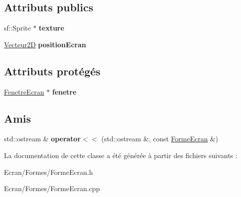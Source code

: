 \subsection*{Attributs publics}
\begin{DoxyCompactItemize}
\item 
\mbox{\label{class_forme_ecran_a7ff2d2356559ecc65ab475e5928ae1d4}} 
sf\+::\+Sprite $\ast$ {\bfseries texture}
\item 
\mbox{\label{class_forme_ecran_a0f01418938b55cdea36396e2d215b4cf}} 
\mbox{\hyperlink{class_vecteur2_d}{Vecteur2D}} {\bfseries position\+Ecran}
\end{DoxyCompactItemize}
\subsection*{Attributs protégés}
\begin{DoxyCompactItemize}
\item 
\mbox{\label{class_forme_ecran_a65ab2b50df82aa93e629bf7df1a5ff09}} 
\mbox{\hyperlink{class_fenetre_ecran}{Fenetre\+Ecran}} $\ast$ {\bfseries fenetre}
\end{DoxyCompactItemize}
\subsection*{Amis}
\begin{DoxyCompactItemize}
\item 
\mbox{\label{class_forme_ecran_ace3406dee04b0ad37769553ffd4f97a5}} 
std\+::ostream \& {\bfseries operator$<$$<$} (std\+::ostream \&, const \mbox{\hyperlink{class_forme_ecran}{Forme\+Ecran}} \&)
\end{DoxyCompactItemize}


La documentation de cette classe a été générée à partir des fichiers suivants \+:\begin{DoxyCompactItemize}
\item 
Ecran/\+Formes/Forme\+Ecran.\+h\item 
Ecran/\+Formes/Forme\+Ecran.\+cpp\end{DoxyCompactItemize}
